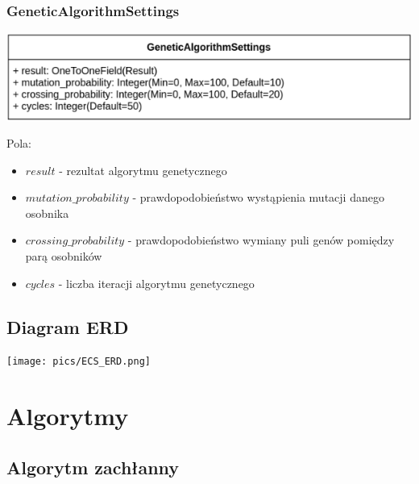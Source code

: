 \documentclass[pdflatex,11pt]{../aghdoc_version2}
\begin{document}
\subsection{GeneticAlgorithmSettings}
\begin{center}
\centerline{\includegraphics[scale=0.85]{pics/GeneticAlgorithmSettings.png}}
\end{center}
Pola:
\begin{itemize}
\item $result$ - rezultat algorytmu genetycznego
\item $mutation\_probability$ - prawdopodobieństwo wystąpienia mutacji danego osobnika
\item $crossing\_probability$ - prawdopodobieństwo wymiany puli genów pomiędzy parą
osobników
\item $cycles$ - liczba iteracji algorytmu genetycznego
\end{itemize}

\section{Diagram ERD}
\begin{center}
\centerline{\texttt{[image: pics/ECS\_ERD.png]}}
\end{center}

\chapter{Algorytmy}
\section{Algorytm zachłanny}
\end{document}
